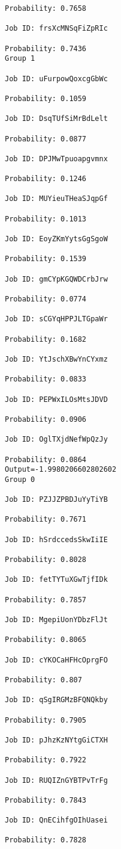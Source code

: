 \documentclass[11pt]{article}
\begin{document}
\begin{Verbatim}[commandchars=\\\{\}]
Probability: 0.7658

Job ID: frsXcMNSqFiZpRIc

Probability: 0.7436
Group 1

Job ID: uFurpowQoxcgGbWc

Probability: 0.1059

Job ID: DsqTUfSiMrBdLelt

Probability: 0.0877

Job ID: DPJMwTpuoapgvmnx

Probability: 0.1246

Job ID: MUYieuTHeaSJqpGf

Probability: 0.1013

Job ID: EoyZKmYytsGgSgoW

Probability: 0.1539

Job ID: gmCYpKGQWDCrbJrw

Probability: 0.0774

Job ID: sCGYqHPPJLTGpaWr

Probability: 0.1682

Job ID: YtJschXBwYnCYxmz

Probability: 0.0833

Job ID: PEPWxILOsMtsJDVD

Probability: 0.0906

Job ID: OglTXjdNefWpQzJy

Probability: 0.0864
Output=-1.9980206602802602
Group 0

Job ID: PZJJZPBDJuYyTiYB

Probability: 0.7671

Job ID: hSrdccedsSkwIiIE

Probability: 0.8028

Job ID: fetTYTuXGwTjfIDk

Probability: 0.7857

Job ID: MgepiUonYDbzFlJt

Probability: 0.8065

Job ID: cYKOCaHFHcOprgFO

Probability: 0.807

Job ID: qSgIRGMzBFQNQkby

Probability: 0.7905

Job ID: pJhzKzNYtgGiCTXH

Probability: 0.7922

Job ID: RUQIZnGYBTPvTrFg

Probability: 0.7843

Job ID: QnECihfgOIhUasei

Probability: 0.7828


\end{Verbatim}
\end{document}
